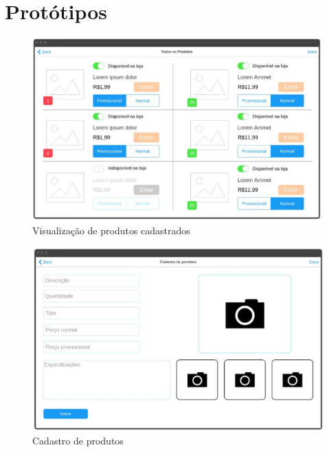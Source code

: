 \documentclass[a4paper,12pt]{monografia}
\begin{document}

\section{Protótipos} %
\label{sec:prototipos}

\begin{figure}[H]
\centering
\includegraphics[width=12cm]{img/prototipos/produtos-cadastrados.eps}
\caption{Visualização de produtos cadastrados}
\label{figura:produtos_cadastrados}
\end{figure}

\begin{figure}[H]
\centering
\includegraphics[width=12cm]{img/prototipos/cadastro-produto.eps}
\caption{Cadastro de produtos}
\label{figura:Cadastro_de_Produtos}
\end{figure}
\end{document}
